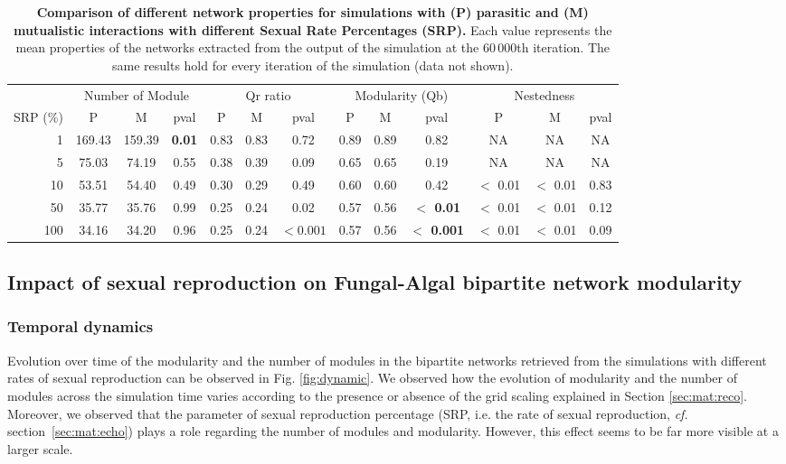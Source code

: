 \documentclass[fleqn,10pt]{wlscirep}
\begin{document}
\begin{table}[ht]
\centering
\begin{tabular}{rcccccccccccc}
  \hline
  & \multicolumn{3}{c}{Number of Module}& \multicolumn{3}{c}{Qr ratio} & \multicolumn{3}{c}{Modularity (Qb)} & \multicolumn{3}{c}{Nestedness} \\
 SRP (\%)& P & M & pval & P & M & pval & P & M & pval & P & M & pval \\\hline
1 & 169.43 & 159.39 & \textbf{0.01} & 0.83 & 0.83 & 0.72 & 0.89 & 0.89 & 0.82 & NA & NA & NA \\
  5 & 75.03 & 74.19 & 0.55 & 0.38 & 0.39 & 0.09 & 0.65 & 0.65 & 0.19 & NA & NA & NA \\
  10 & 53.51 & 54.40 & 0.49 & 0.30 & 0.29 & 0.49 & 0.60 & 0.60 & 0.42 & $<$ 0.01&$<$ 0.01 & 0.83 \\
  50 & 35.77 & 35.76 & 0.99 & 0.25 & 0.24 & 0.02 & 0.57 & 0.56 & \textbf{$<$ 0.01} &$<$ 0.01 &$<$ 0.01 & 0.12 \\
  100 & 34.16 & 34.20 & 0.96 & 0.25 & 0.24 & $\mathbf{<0.001}$ & 0.57 & 0.56 &\textbf{$<$ 0.001}  & $<$ 0.01 &$<$ 0.01 & 0.09 \\
   \hline
\end{tabular}
\caption{\textbf{Comparison of different network properties for simulations with (P) parasitic and (M) mutualistic interactions with different Sexual Rate Percentages (SRP).} Each value represents the mean properties of the networks extracted from the output of the simulation at the $60\,000$th iteration. The same results hold for every iteration of the simulation (data not shown).}
\label{tab:parasitism-mutualism}
\end{table}


\subsection{Impact of sexual reproduction on Fungal-Algal bipartite network modularity}
\label{sec:res:sex}

\subsubsection{Temporal dynamics}
\label{sec:res:sex:temp}
Evolution over time of the modularity and the number of modules in the bipartite networks retrieved from the simulations with different rates of sexual reproduction can be observed in Fig. \ref{fig:dynamic}. We observed how the evolution of modularity and the number of modules across the simulation time varies according to the presence or absence of the grid scaling explained in Section \ref{sec:mat:reco}. Moreover, we observed that the parameter of sexual reproduction percentage (SRP, i.e. the rate of sexual reproduction, \emph{cf.} section~\ref{sec:mat:echo}) plays a role regarding the number of modules and modularity. However, this effect seems to be far more visible at a larger scale.
\end{document}
